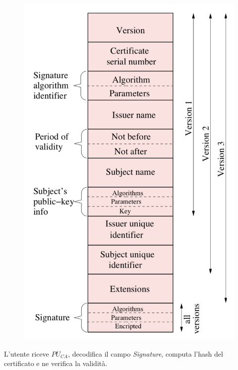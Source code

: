 \documentclass[11pt, a4paper, twoside, italian]{report}
\theoremstyle{plain}
\begin{document}
\begin{multicols}{2}
\begin{figure}[H]
		\includegraphics[scale=0.43]{x509}
	\end{figure}
\end{multicols}

\noindent
L'utente riceve $PU_{CA}$, decodifica il campo \textit{Signature}, computa l'hash del certificato e ne verifica la validità.
\end{document}
